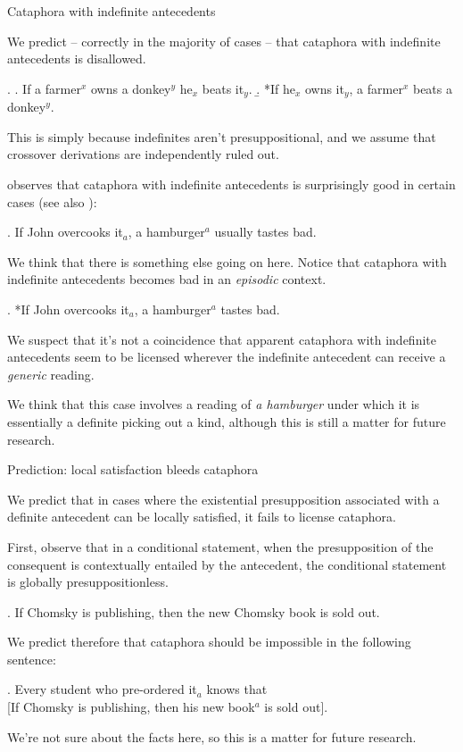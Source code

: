 \documentclass{beamer}
\begin{document}
\begin{frame}[allowframebreaks]{Cataphora with indefinite antecedents}

  We predict -- correctly in the majority of cases -- that cataphora with indefinite antecedents is disallowed.

  \exi.
  \a. If a farmer\(^{x}\) owns a donkey\(^{y}\) he\(_{x}\) beats it\(_{y}\).
  \b. *If he\(_{x}\) owns it\(_{y}\), a farmer\(^{x}\) beats a donkey\(^{y}\).

  This is simply because indefinites aren't presuppositional, and we assume that crossover derivations are independently ruled out.

  \framebreak

  \citet[p.\,192]{chierchia_dynamics_1995} observes that cataphora with indefinite antecedents is surprisingly good in certain cases (see also \citealt{barkerShan2008}):

  \ex. If John overcooks it\(_{a}\), a hamburger\(^{a}\) usually tastes bad.

  \framebreak

  We think that there is something else going on here. Notice that cataphora with indefinite antecedents becomes bad in an \textit{episodic} context.

  \ex. *If John overcooks it\(_{a}\), a hamburger\(^{a}\) tastes bad.

  We suspect that it's not a coincidence that apparent cataphora with indefinite antecedents seem to be licensed wherever the indefinite antecedent can receive a \textit{generic} reading.

  We think that this case involves a reading of \textit{a hamburger} under which it is essentially a definite picking out a kind, although this is still a matter for future research.

\end{frame}

\begin{frame}[allowframebreaks]{Prediction: local satisfaction bleeds cataphora}

  We predict that in cases where the existential presupposition associated with a definite antecedent can be locally satisfied, it fails to license cataphora.

  First, observe that in a conditional statement, when the presupposition of the consequent is contextually entailed by the antecedent, the conditional statement is globally presuppositionless.

  \ex. If Chomsky is publishing, then the new Chomsky book is sold out.

  \framebreak

  We predict therefore that cataphora should be impossible in the following sentence:

  \ex. Every student who pre-ordered it\(_{a}\) knows that\\
  {[}If Chomsky is publishing, then his new book\(^{a}\) is sold out].

  We're not sure about the facts here, so this is a matter for future research.

\end{frame}
\end{document}

